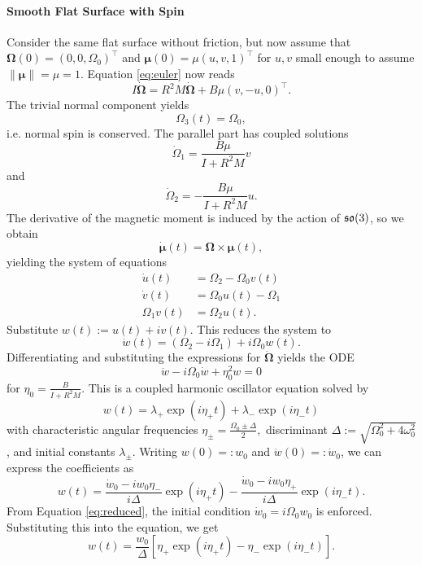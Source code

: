\paragraph*{Smooth Flat Surface with Spin}
Consider the same flat surface without friction, but now assume that $\bm{\Omega}(0)=(0,0,\Omega_0)^\top$ and $\bm{\mu}(0)=\mu(u,v,1)^\top$ for $u,v$ small enough to assume $\|\bm{\mu}\|=\mu=1$. Equation \ref{eq:euler} now reads \[
    I \dot{\bm{\Omega}} = R^2M \dot{\bm{\Omega}} + B\mu (v,-u,0)^\top
.\] The trivial normal component yields \[
\Omega_3(t)=\Omega_0
,\] i.e. normal spin is conserved. The parallel part has coupled solutions \[
\dot{\Omega}_1 = \frac{B\mu}{I+R^2M} v
\]  and \[
\dot{\Omega}_2 = -\frac{B\mu}{I+R^2M} u
.\] The derivative of the magnetic moment is induced by the action of $\operatorname{\mathfrak{s}\mathfrak{o}}(3)$, so we obtain \[
\dot{\bm{\mu}}(t)=\bm{\Omega} \times \bm{\mu}(t)
,\] yielding the system of equations
\begin{align*}
    \dot{u}(t)&=\Omega_2 - \Omega_0 v(t) \\ \dot{v}(t)&= \Omega_0 u(t) - \Omega_1 \\ \Omega_1 v(t)&=\Omega_2 u(t)
.
\end{align*}
Substitute $w(t) := u(t)+iv(t)$. This reduces the system to
\begin{equation}
    \label{eq:reduced}
    \dot{w}(t)=(\Omega_2 - i \Omega_1) + i \Omega_0 w(t).
\end{equation}
Differentiating and substituting the expressions for $\dot{\bm{\Omega}}$ yields the ODE 
\begin{equation}
    \ddot{w} - i \Omega_0 \dot{w} + \eta_0^2 w = 0
\end{equation}
for $\eta_0 = \frac{B}{I+R^2M}$. This is a coupled harmonic oscillator equation solved by 
\begin{equation*}
    w(t)=\lambda_+ \exp(i\eta_+ t) + \lambda_- \exp(i \eta_- t)
\end{equation*}
with characteristic angular frequencies $\eta_\pm = \frac{\Omega_0 \pm \Delta}{2},$ discriminant $\Delta := \sqrt{\Omega_0^2 +4\omega_0^2}$, and initial constants $\lambda_\pm$. Writing $w(0)=:w_0$ and $\dot{w}(0)=:\dot{w}_0$, we can express the coefficients as \[
    w(t)=\frac{\dot{w}_0 - i w_0 \eta_-}{i\Delta} \exp(i\eta_+t)- \frac{\dot{w}_0 -iw_0 \eta_+ }{i\Delta} \exp(i \eta_- t)
.\] From Equation \ref{eq:reduced}, the initial condition $\dot{w}_0=i\Omega_0w_0$ is enforced. Substituting this into the equation, we get \[
w(t)=\frac{w_0}{\Delta}\left[\eta_+\exp(i\eta_+ t) - \eta_- \exp(i\eta_-t)\right] 
.\] 
